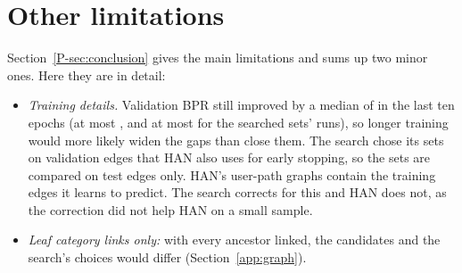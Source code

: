 \section{Other limitations}
\label{app:limits}

Section~\ref*{P-sec:conclusion} gives the main limitations and sums up two minor ones. Here they are in
detail:
\begin{itemize}
  \item \emph{Training details.} Validation BPR still improved by a median of  in
        the last ten epochs (at most , and at most  for
        the searched sets' runs), so longer training would more likely widen the gaps than close
        them. The search chose its sets on validation edges that HAN also uses for early stopping,
        so the sets are compared on test edges only. HAN's user-path graphs contain the training
        edges it learns to predict. The search corrects for this and HAN does not, as the
        correction did not help HAN on a small sample.
  \item \emph{Leaf category links only:} with every ancestor linked, the candidates and the
        search's choices would differ (Section~\ref{app:graph}).
\end{itemize}
